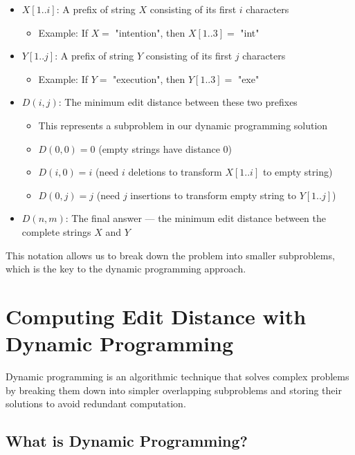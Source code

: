 \documentclass[11pt,a4paper]{article}
\theoremstyle{definition}
\theoremstyle{plain}
\theoremstyle{remark}
\begin{document}
\begin{itemize}
    \item \textbf{$X[1..i]$}: A prefix of string $X$ consisting of its first $i$ characters
    \begin{itemize}
        \item Example: If $X = $ "intention", then $X[1..3] = $ "int"
    \end{itemize}
    
    \item \textbf{$Y[1..j]$}: A prefix of string $Y$ consisting of its first $j$ characters
    \begin{itemize}
        \item Example: If $Y = $ "execution", then $Y[1..3] = $ "exe"
    \end{itemize}
    
    \item \textbf{$D(i,j)$}: The minimum edit distance between these two prefixes
    \begin{itemize}
        \item This represents a subproblem in our dynamic programming solution
        \item $D(0,0) = 0$ (empty strings have distance 0)
        \item $D(i,0) = i$ (need $i$ deletions to transform $X[1..i]$ to empty string)
        \item $D(0,j) = j$ (need $j$ insertions to transform empty string to $Y[1..j]$)
    \end{itemize}
    
    \item \textbf{$D(n,m)$}: The final answer — the minimum edit distance between the complete strings $X$ and $Y$
\end{itemize}

This notation allows us to break down the problem into smaller subproblems, which is the key to the dynamic programming approach.

\section{Computing Edit Distance with Dynamic Programming}

Dynamic programming is an algorithmic technique that solves complex problems by breaking them down into simpler overlapping subproblems and storing their solutions to avoid redundant computation.

\subsection{What is Dynamic Programming?}
\end{document}
